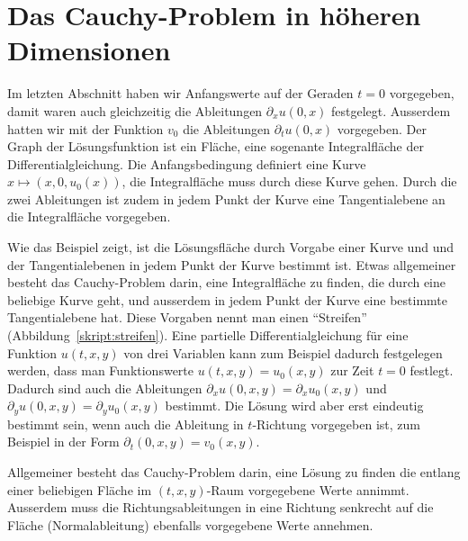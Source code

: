 %
%
%
\section{Das Cauchy-Problem in höheren Dimensionen}
Im letzten Abschnitt haben wir Anfangswerte auf der Geraden $t=0$
vorgegeben, damit waren auch gleichzeitig die Ableitungen 
$\partial_x u(0,x)$ festgelegt. Ausserdem hatten wir mit der Funktion $v_0$
die Ableitungen $\partial_t u(0,x)$ vorgegeben.
Der Graph der Lösungsfunktion ist ein Fläche, eine sogenante
Integralfläche der Differentialgleichung. Die Anfangsbedingung
definiert eine Kurve $x\mapsto(x,0,u_0(x))$, die Integralfläche muss
durch diese Kurve gehen.
Durch die zwei Ableitungen ist zudem in jedem Punkt der Kurve
eine Tangentialebene an die Integralfläche vorgegeben.

Wie das Beispiel zeigt, ist die Lösungsfläche durch Vorgabe einer Kurve und
und der Tangentialebenen in jedem Punkt der Kurve bestimmt ist.
Etwas allgemeiner besteht das Cauchy-Problem darin, eine Integralfläche
zu finden, die durch eine beliebige Kurve geht, und ausserdem in jedem Punkt
der Kurve eine bestimmte Tangentialebene hat. Diese Vorgaben nennt man
einen ``Streifen'' (Abbildung~\ref{skript:streifen}).
Eine partielle Differentialgleichung für eine Funktion $u(t,x,y)$
von drei Variablen kann zum Beispiel dadurch festgelegen werden,
dass man Funktionswerte $u(t,x,y)=u_0(x,y)$ zur Zeit $t=0$ festlegt.
Dadurch sind auch die Ableitungen $\partial_x u(0,x,y)=\partial_xu_0(x,y)$
und $\partial_y u(0,x,y)=\partial_y u_0(x,y)$ bestimmt. Die Lösung wird
aber erst eindeutig bestimmt sein, wenn auch die Ableitung in $t$-Richtung
vorgegeben ist, zum Beispiel in der Form $\partial_t(0,x,y)=v_0(x,y)$.

Allgemeiner besteht das Cauchy-Problem darin, eine Lösung zu finden
die entlang einer beliebigen Fläche im $(t,x,y)$-Raum vorgegebene
Werte annimmt. Ausserdem muss die Richtungsableitungen in eine Richtung
senkrecht auf die Fläche (Normalableitung) ebenfalls vorgegebene Werte annehmen.


